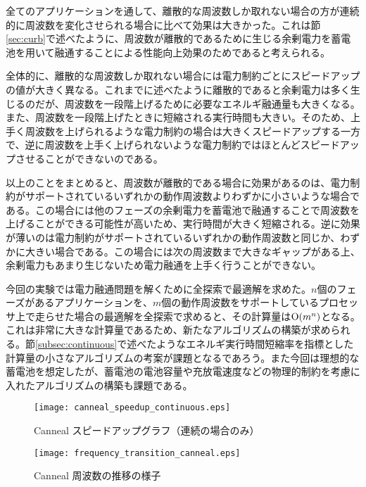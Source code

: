 全てのアプリケーションを通して、離散的な周波数しか取れない場合の方が連続的に周波数を変化させられる場合に比べて効果は大きかった。これは節\ref{sec:curb}で述べたように、周波数が離散的であるために生じる余剰電力を蓄電池を用いて融通することによる性能向上効果のためであると考えられる。

全体的に、離散的な周波数しか取れない場合には電力制約ごとにスピードアップの値が大きく異なる。これまでに述べたように離散的であると余剰電力は多く生じるのだが、周波数を一段階上げるために必要なエネルギ融通量も大きくなる。また、周波数を一段階上げたときに短縮される実行時間も大きい。そのため、上手く周波数を上げられるような電力制約の場合は大きくスピードアップする一方で、逆に周波数を上手く上げられないような電力制約ではほとんどスピードアップさせることができないのである。

以上のことをまとめると、周波数が離散的である場合に効果があるのは、電力制約がサポートされているいずれかの動作周波数よりわずかに小さいような場合である。この場合には他のフェーズの余剰電力を蓄電池で融通することで周波数を上げることができる可能性が高いため、実行時間が大きく短縮される。逆に効果が薄いのは電力制約がサポートされているいずれかの動作周波数と同じか、わずかに大きい場合である。この場合には次の周波数まで大きなギャップがある上、余剰電力もあまり生じないため電力融通を上手く行うことができない。

今回の実験では電力融通問題を解くために全探索で最適解を求めた。$n$個のフェーズがあるアプリケーションを、$m$個の動作周波数をサポートしているプロセッサ上で走らせた場合の最適解を全探索で求めると、その計算量は${\rm O}(m^n)$となる。これは非常に大きな計算量であるため、新たなアルゴリズムの構築が求められる。節\ref{subsec:continuous}で述べたようなエネルギ実行時間短縮率を指標とした計算量の小さなアルゴリズムの考案が課題となるであろう。また今回は理想的な蓄電池を想定したが、蓄電池の電池容量や充放電速度などの物理的制約を考慮に入れたアルゴリズムの構築も課題である。

\begin{figure}[t]
 \begin{center}
  \texttt{[image: canneal\_speedup\_continuous.eps]}
 \end{center}
 \caption{Canneal スピードアップグラフ（連続の場合のみ）}
 \label{fig:canneal_speedup_continuous}
\end{figure}

\begin{figure}[t]
 \begin{center}
  \texttt{[image: frequency\_transition\_canneal.eps]}
 \end{center}
 \caption{Canneal 周波数の推移の様子}
 \label{fig:frequency_transition_canneal}
\end{figure}









